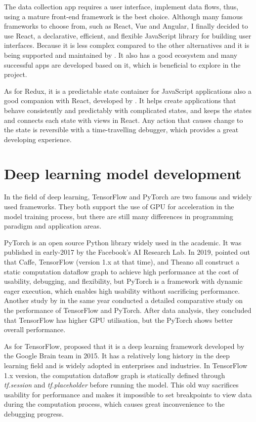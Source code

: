 The data collection app requires a user interface, implement data flows, thus, using a mature front-end framework is the best choice.
Although many famous frameworks to choose from, such as React, Vue and Angular, I finally decided to use React, a declarative, efficient, and flexible JavaScript library for building user interfaces.
Because it is less complex compared to the other alternatives and it is being supported and maintained by \citet{react2021}.
It also has a good ecosystem and many successful apps are developed based on it, which is beneficial to explore in the project.

As for Redux, it is a predictable state container for JavaScript applications also a good companion with React, developed by \citet{redux2021}.
It helps create applications that behave consistently and predictably with complicated states, and keeps the states and connects each state with views in React.
Any action that causes change to the state is reversible with a time-travelling debugger, which provides a great developing experience.

\section{Deep learning model development}
In the field of deep learning, TensorFlow and PyTorch are two famous and widely used frameworks.
They both support the use of GPU for acceleration in the model training process, but there are still many differences in programming paradigm and application areas.

PyTorch is an open source Python library widely used in the academic.
It was published in early-2017 by the Facebook's AI Research Lab.
In 2019, \citet{steiner2019pytorch} pointed out that Caffe, TensorFlow (version 1.x at that time), and Theano all construct a static computation dataflow graph to achieve high performance at the cost of usability, debugging, and flexibility, but PyTorch is a framework with dynamic eager execution, which enables high usability without sacrificing performance.
Another study by \citet{florencio2019performance} in the same year conducted a detailed comparative study on the performance of TensorFlow and PyTorch.
After data analysis, they concluded that TensorFlow has higher GPU utilisation, but the PyTorch shows better overall performance.

As for TensorFlow, \citet{abadi2015tensorflow} proposed that it is a deep learning framework developed by the Google Brain team in 2015.
It has a relatively long history in the deep learning field and is widely adopted in enterprises and industries.
In TensorFlow 1.x version, the computation dataflow graph is statically defined through \textit{tf.session} and \textit{tf.placeholder} before running the model.
This old way sacrifices usability for performance and makes it impossible to set breakpoints to view data during the computation process, which causes great inconvenience to the debugging progress.

